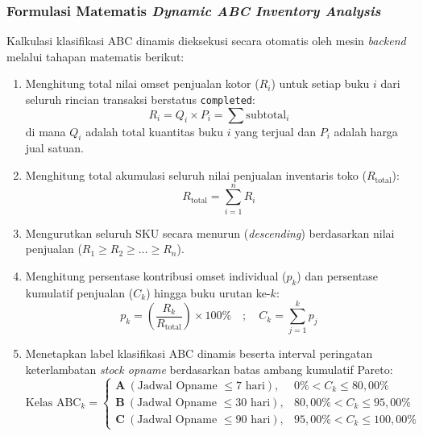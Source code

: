 \documentclass[11pt, a4paper]{article}
\begin{document}
\subsubsection{Formulasi Matematis \textit{Dynamic ABC Inventory Analysis}}
Kalkulasi klasifikasi ABC dinamis dieksekusi secara otomatis oleh mesin \textit{backend} melalui tahapan matematis berikut:
\begin{enumerate}[label=\arabic*.]
    \item Menghitung total nilai omset penjualan kotor ($R_i$) untuk setiap buku $i$ dari seluruh rincian transaksi berstatus \texttt{completed}:
    \begin{equation}
        R_i = Q_i \times P_i = \sum \text{subtotal}_i
    \end{equation}
    di mana $Q_i$ adalah total kuantitas buku $i$ yang terjual dan $P_i$ adalah harga jual satuan.
    \item Menghitung total akumulasi seluruh nilai penjualan inventaris toko ($R_{\text{total}}$):
    \begin{equation}
        R_{\text{total}} = \sum_{i=1}^{n} R_i
    \end{equation}
    \item Mengurutkan seluruh SKU secara menurun (\textit{descending}) berdasarkan nilai penjualan ($R_1 \ge R_2 \ge \dots \ge R_n$).
    \item Menghitung persentase kontribusi omset individual ($p_k$) dan persentase kumulatif penjualan ($C_k$) hingga buku urutan ke-$k$:
    \begin{equation}
        p_k = \left( \frac{R_k}{R_{\text{total}}} \right) \times 100\% \quad;\quad C_k = \sum_{j=1}^{k} p_j
    \end{equation}
    \item Menetapkan label klasifikasi ABC dinamis beserta interval peringatan keterlambatan \textit{stock opname} berdasarkan batas ambang kumulatif Pareto:
    \begin{equation}
    \text{Kelas ABC}_k = 
    \begin{cases} 
    \mathbf{A} \ (\text{Jadwal Opname } \le 7 \text{ hari}), & 0\% < C_k \le 80{,}00\% \\ 
    \mathbf{B} \ (\text{Jadwal Opname } \le 30 \text{ hari}), & 80{,}00\% < C_k \le 95{,}00\% \\ 
    \mathbf{C} \ (\text{Jadwal Opname } \le 90 \text{ hari}), & 95{,}00\% < C_k \le 100{,}00\% 
    \end{cases}
    \end{equation}
\end{enumerate}
\end{document}
